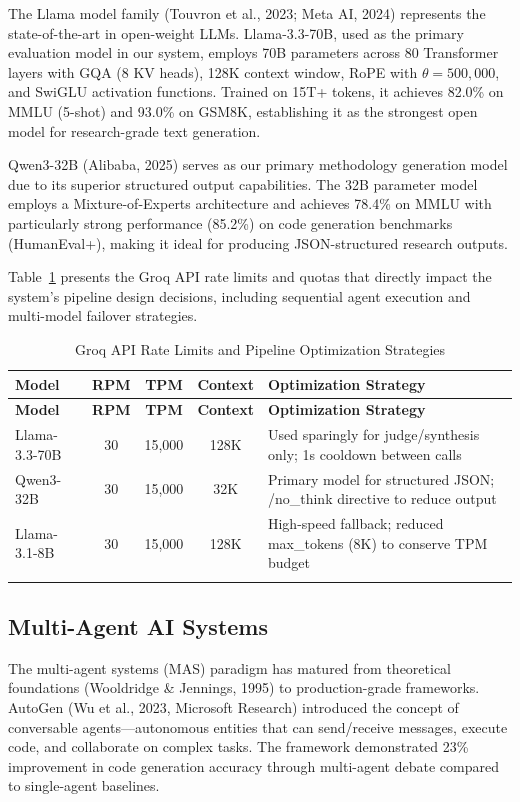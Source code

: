 \documentclass[a4paper,12pt,openany]{report}
\begin{document}
The Llama model family (Touvron et al., 2023; Meta AI, 2024) represents the state-of-the-art in open-weight LLMs. Llama-3.3-70B, used as the primary evaluation model in our system, employs 70B parameters across 80 Transformer layers with GQA (8 KV heads), 128K context window, RoPE with $\theta = 500{,}000$, and SwiGLU activation functions. Trained on 15T+ tokens, it achieves 82.0\% on MMLU (5-shot) and 93.0\% on GSM8K, establishing it as the strongest open model for research-grade text generation.

Qwen3-32B (Alibaba, 2025) serves as our primary methodology generation model due to its superior structured output capabilities. The 32B parameter model employs a Mixture-of-Experts architecture and achieves 78.4\% on MMLU with particularly strong performance (85.2\%) on code generation benchmarks (HumanEval+), making it ideal for producing JSON-structured research outputs.

Table~\ref{tab:groq_limits} presents the Groq API rate limits and quotas that directly impact the system's pipeline design decisions, including sequential agent execution and multi-model failover strategies.

\begin{longtable}{|p{2.5cm}|c|c|c|p{5.5cm}|}
\hline
\textbf{Model} & \textbf{RPM} & \textbf{TPM} & \textbf{Context} & \textbf{Optimization Strategy} \\
\hline
\endfirsthead
\hline
\textbf{Model} & \textbf{RPM} & \textbf{TPM} & \textbf{Context} & \textbf{Optimization Strategy} \\
\hline
\endhead
\hline
\endfoot
Llama-3.3-70B & 30 & 15,000 & 128K & Used sparingly for judge/synthesis only; 1s cooldown between calls \\
\hline
Qwen3-32B & 30 & 15,000 & 32K & Primary model for structured JSON; /no\_think directive to reduce output \\
\hline
Llama-3.1-8B & 30 & 15,000 & 128K & High-speed fallback; reduced max\_tokens (8K) to conserve TPM budget \\
\hline

\caption{Groq API Rate Limits and Pipeline Optimization Strategies}
\label{tab:groq_limits}
\end{longtable}

\subsection{Multi-Agent AI Systems}

The multi-agent systems (MAS) paradigm has matured from theoretical foundations (Wooldridge \& Jennings, 1995) to production-grade frameworks. AutoGen (Wu et al., 2023, Microsoft Research) introduced the concept of conversable agents---autonomous entities that can send/receive messages, execute code, and collaborate on complex tasks. The framework demonstrated 23\% improvement in code generation accuracy through multi-agent debate compared to single-agent baselines.
\end{document}
